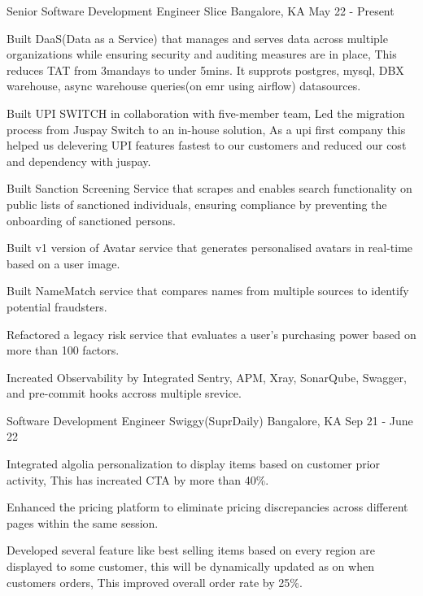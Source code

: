 \begin{cventries}
  \cventry
    {Senior Software Development Engineer}
    {Slice}
    {Bangalore, KA}
    {May 22 - Present}
    {
      \begin{cvitems}
        \item {Built DaaS(Data as a Service) that manages and serves data across multiple organizations while ensuring security and auditing measures are in place, This reduces TAT from 3mandays to under 5mins. It supprots postgres, mysql, DBX warehouse, async warehouse queries(on emr using airflow) datasources.}
        \item {Built UPI SWITCH in collaboration with five-member team, Led the migration process from Juspay Switch to an in-house solution, As a upi first company this helped us delevering UPI features fastest to our customers and reduced our cost and dependency with juspay.}
        \item {Built Sanction Screening Service that scrapes and enables search functionality on public lists of sanctioned individuals, ensuring compliance by preventing the onboarding of sanctioned persons.}
        \item {Built v1 version of Avatar service that generates personalised avatars in real-time based on a user image.}
        \item {Built NameMatch service that compares names from multiple sources to identify potential fraudsters.}
        \item {Refactored a legacy risk service that evaluates a user's purchasing power based on more than 100 factors.}
        \item {Increated Observability by Integrated Sentry, APM, Xray, SonarQube, Swagger, and pre-commit hooks accross multiple srevice.}
      \end{cvitems}
    }
  
  \cventry
    {Software Development Engineer}
    {Swiggy(SuprDaily)}
    {Bangalore, KA}
    {Sep 21 - June 22}
    {
      \begin{cvitems}
        \item {Integrated algolia personalization to display items based on customer prior activity, This has increated CTA by more than 40\%.}
        \item {Enhanced the pricing platform to eliminate pricing discrepancies across different pages within the same session.}
        \item {Developed several feature like best selling items based on every region are displayed to some customer, this will be dynamically updated as on when customers orders, This improved overall order rate by 25\%.}
      \end{cvitems}
    }
  

\end{cventries}
